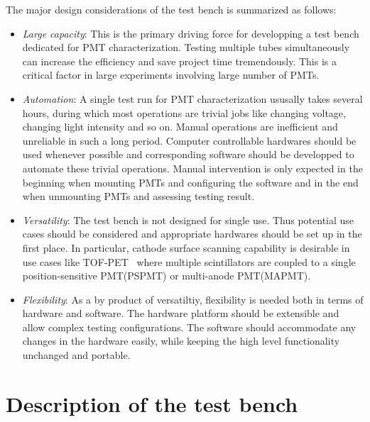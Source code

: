 \documentclass[review,number,sort&compress]{elsarticle}
\begin{document}
The major design considerations of the test bench is summarized as follows:
\begin{itemize}
 \item \textit{Large capacity}: This is the primary driving force for developping a test bench dedicated for PMT characterization.
 Testing multiple tubes simultaneously can increase the efficiency and save project time tremendously.
 This is a critical factor in large experiments involving large number of PMTs.
 \item \textit{Automation}: A single test run for PMT characterization ususally takes several hours, during which most operations are trivial jobs like changing voltage, changing light intensity and so on.
 Manual operations are inefficient and unreliable in such a long period.
 Computer controllable hardwares should be used whenever possible and corresponding software should be developped to automate these trivial operations.
 Manual intervention is only expected in the beginning when mounting PMTs and configuring the software and in the end when unmounting PMTs and assessing testing result. 
 \item \textit{Versatility}: The test bench is not designed for single use.
 T\-h\-u\-s potential use cases should be considered and appropriate hardwares should be set up in the first place.
 In particular, cathode surface scanning capability is desirable in use cases like TOF-PET~\cite{tof_pet} where multiple scintillators are coupled to a single position-sensitive PMT(PSPMT) or multi-anode PMT(MAPMT). 
 \item \textit{Flexibility}: As a by product of versatiltiy, flexibility is needed both in terms of hardware and software.
 The hardware platform should be extensible and allow complex testing configurations.
 The software should accommodate any changes in the hardware easily, while keeping the high level functionality unchanged and portable. 
\end{itemize}


\section{Description of the test bench}
\label{sec:description}
\end{document}
